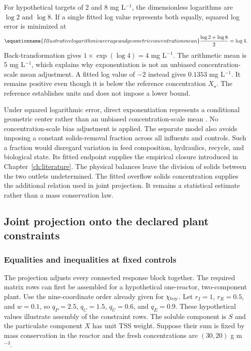 For hypothetical targets of 2 and 8 mg L$^{-1}$, the dimensionless logarithms are $\log2$ and $\log8$. If a single fitted log value represents both equally, squared log error is minimized at
\begin{equation}
\equationname{Illustrative logarithmic average and geometric concentration mean}
\frac{\log2+\log8}{2}=\log4.
\end{equation}
Back-transformation gives $1\times\exp(\log4)=4$ mg L$^{-1}$. The arithmetic mean is 5 mg L$^{-1}$, which explains why exponentiation is not an unbiased concentration-scale mean adjustment. A fitted log value of $-2$ instead gives $0.1353$ mg L$^{-1}$. It remains positive even though it is below the reference concentration $X_\star$. The reference establishes units and does not impose a lower bound.

Under squared logarithmic error, direct exponentiation represents a conditional geometric center rather than an unbiased concentration-scale mean \citep{Tofallis2015}. No concentration-scale bias adjustment is applied. The separate model also avoids imposing a constant solids-removal fraction across all influents and controls. Such a fraction would disregard variation in feed composition, hydraulics, recycle, and biological state. Its fitted endpoint supplies the empirical closure introduced in Chapter~\ref{ch:literature}. The physical balances leave the division of solids between the two outlets undetermined. The fitted overflow solids concentration supplies the additional relation used in joint projection. It remains a statistical estimate rather than a mass conservation law.

\subsection{Joint projection onto the declared plant constraints}

\subsubsection{Equalities and inequalities at fixed controls}

The projection adjusts every connected response block together. The required matrix rows can first be assembled for a hypothetical one-reactor, two-component plant. Use the nine-coordinate order already given for $\chi_{\rm toy}$. Let $r_I=1$, $r_R=0.5$, and $w=0.1$, so $q_P=2.5$, $q_C=1.5$, $q_U=0.6$, and $q_E=0.9$. These hypothetical values illustrate assembly of the constraint rows. The soluble component is $S$ and the particulate component $X$ has unit TSS weight. Suppose their sum is fixed by mass conservation in the reactor and the fresh concentrations are $(30,20)$ g m$^{-3}$.

